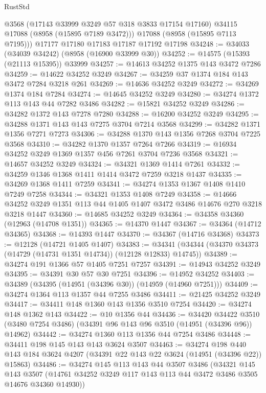 \begin{lexlean}{RustStd}
\begin{coremodule}
        @3568
        (@17143 @33999 @3249 @57 @318 @3833 @17154 @17160)
        @34115
        @17088
        (@8958 (@15895 @7189 @3472)))
      @17088
      (@8958 (@15895 @7113 @7195)))
    @17177
    @17180
    @17183
    @17187
    @17192
    @17198
@34248 := @34033 (@34039 @34242) (@8958 (@16900 @33999 @30))
@34252 := @14575 (@15393 (@21113 @15395)) @33999
@34257 := @14613 @34252 @1375 @143 @3472 @7286
@34259 := @14622 @34252 @3249
@34267 := @34259 @37 @1374 @184 @143 @3472 @7284 @3218 @261
@34269 := @14636 @34252 @3249
@34272 := @34269 @1374 @184 @7284
@34274 := @14645 @34252 @3249
@34280 := @34274 @1372 @113 @143 @44 @7282 @3486
@34282 := @15821 @34252 @3249
@34286 := @34282 @1372 @143 @7278 @7280
@34288 := @16200 @34252 @3249
@34295 := @34288 @1371 @143 @143 @7275 @3704 @7214 @3568
@34299 := @34282 @1371 @1356 @7271 @7273
@34306 := @34288 @1370 @143 @1356 @7268 @3704 @7225 @3568
@34310 := @34282 @1370 @1357 @7264 @7266
@34319 := @16934 @34252 @3249 @1369 @1357 @456 @7261 @3704 @7236 @3568
@34321 := @14657 @34252 @3249
@34324 := @34321 @1369 @1414 @7261
@34332 := @34259 @1346 @1368 @1411 @1414 @3472 @7259 @3218 @1437
@34335 := @34269 @1368 @1411 @7259
@34341 := @34274 @1353 @1367 @1408 @1410 @7249 @7258
@34344 := @34321 @1353 @1408 @7249
@34358 := @14666 @34252 @3249 @1351 @113 @44 @1405 @1407 @3472 @3486 @14676 @270 @3218 @3218 @1447
@34360 := @14685 @34252 @3249
@34364 := @34358 @34360 (@12963 (@14708 @1351))
@34365 := @14370 @1447
@34367 := @34364 (@14712 @34365)
@34368 := @14393 @1447
@34370 := @34367 (@14716 @34368)
@34373 := @12128 (@14721 @1405 @1407)
@34383 := @34341 (@34344 (@34370 @34373 (@14729 (@14731 @1351 @14734)) (@12128 @12833) @14745))
@34389 := @34274 @191 @1366 @57 @1405 @7251 @7257
@34391 := @14943 @34252 @3249
@34395 := @34391 @30 @57 @30 @7251
@34396 := @14952 @34252
@34403 := @34389 (@34395 (@14951 (@34396 @30)) (@14959 (@14960 @7251)))
@34409 := @34274 @1364 @113 @1357 @44 @7255 @3486
@34411 := @21425 @34252 @3249
@34417 := @34411 @148 @1360 @143 @1356 @3510 @7254
@34420 := @34274 @148 @1362 @143
@34422 := @10 @1356 @44
@34436 := @34420
    @34422
    @3510
    (@3480 @7254 @3486)
    (@34391 @96 @143 @96 @3510 (@14951 (@34396 @96)) @14962)
@34442 := @34274 @1360 @113 @1356 @44 @7254 @3486
@34448 := @34411 @198 @145 @143 @143 @3624 @3507
@34463 := @34274
    @198
    @440
    @143
    @184
    @3624
    @4207
    (@34391 @22 @143 @22 @3624 (@14951 (@34396 @22)) @15863)
@34486 := @34274
    @145
    @113
    @143
    @44
    @3507
    @3486
    (@34321
      @145
      @143
      @3507
      (@14761 @34252 @3249 @117 @143 @113 @44 @3472 @3486 @3505 @14676 @34360 @14930))

\end{coremodule}
\end{lexlean}
